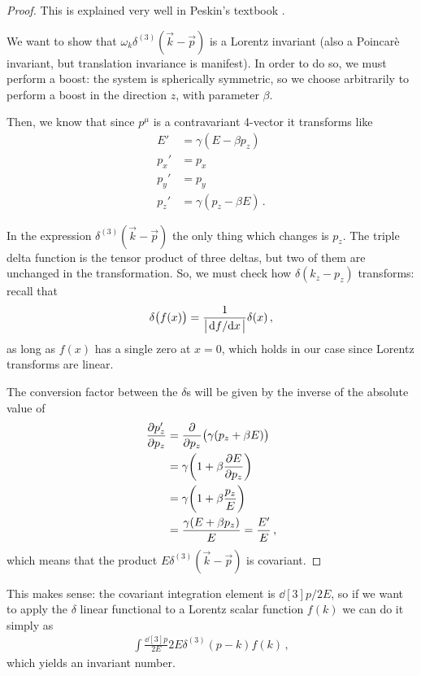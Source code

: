 \documentclass[main.tex]{subfiles}
\begin{document}
\begin{proof}
This is explained very well in Peskin's textbook \cite[section 3.5]{peskinConceptsElementaryParticle2019}.

We want to show that \(\omega_{k}  \delta^{(3)} (\vec{k} - \vec{p})\) is a Lorentz invariant (also a Poincarè invariant, but translation invariance is manifest). In order to do so, we must perform a boost: the system is spherically symmetric, so we choose arbitrarily to perform a boost in the direction \(z\), with parameter \(\beta \). 

Then, we know that since \(p^{\mu }\) is a contravariant 4-vector it transforms like 
%
\begin{align}
E' &= \gamma (E - \beta p_{z}) \\
p_{x}' &= p_{x} \\
p_{y}' &= p_{y} \\
p_{z}' &= \gamma (p_{z} - \beta E)
\,.
\end{align}

In the expression \(\delta^{(3)} (\vec{k} - \vec{p})\) the only thing which changes is \(p_{z}\). The triple delta function is the tensor product of three deltas, but two of them are unchanged in the transformation.
So, we must check how \(\delta (k_{z} - p_{z})\) transforms: recall that 
%
\begin{align}
\delta \qty(f(x)) = \frac{1}{\abs{\dv*{f}{x}}} \delta (x) 
\,,
\end{align}
%
as long as \(f(x)\) has a single zero at \(x=0\), which holds in our case since Lorentz transforms are linear.

The conversion factor between the \(\delta \)s will be given by the inverse of the absolute value of
%
\begin{align}
\pdv{p_{z}'}{p_{z}} &= \pdv{}{p_{z}} \qty(\gamma (p_{z} + \beta E))  \\
&= \gamma \qty(1 + \beta \pdv{E}{p_{z}})  \\
&= \gamma \qty(1 + \beta \frac{p_{z}}{E})  \\
&= \frac{\gamma \qty(E + \beta p_z)}{E} = \frac{E'}{E}
\,,
\end{align}
%
which means that the product \(E \delta^{(3)} (\vec{k} - \vec{p})\) is covariant. 
\end{proof}

This makes sense: the covariant integration element is \(\dd[3]{p} / 2 E\), so if we want to apply the \(\delta \) linear functional to a Lorentz scalar function \(f(k)\) we can do it simply as 
%
\begin{align}
\int \frac{ \dd[3]{p}}{2E} 2 E \delta^{(3)} (p-k) f (k) 
\,,
\end{align}
%
which yields an invariant number.
\end{document}
